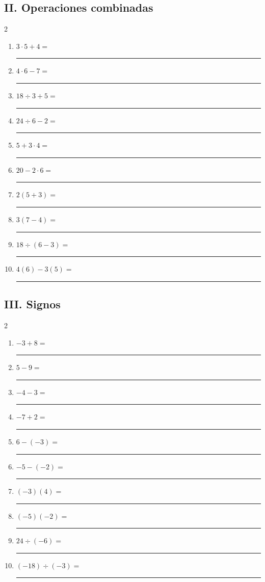\documentclass[11pt]{article}
\begin{document}
\subsection*{II. Operaciones combinadas}
\begin{multicols}{2}\begin{enumerate}[leftmargin=*,start=21]
\item $\displaystyle 3\cdot5+4=$ \rule{2.2cm}{0.4pt}
\item $\displaystyle 4\cdot6-7=$ \rule{2.2cm}{0.4pt}
\item $\displaystyle 18\div3+5=$ \rule{2.2cm}{0.4pt}
\item $\displaystyle 24\div6-2=$ \rule{2.2cm}{0.4pt}
\item $\displaystyle 5+3\cdot4=$ \rule{2.2cm}{0.4pt}
\item $\displaystyle 20-2\cdot6=$ \rule{2.2cm}{0.4pt}
\item $\displaystyle 2(5+3)=$ \rule{2.2cm}{0.4pt}
\item $\displaystyle 3(7-4)=$ \rule{2.2cm}{0.4pt}
\item $\displaystyle 18\div(6-3)=$ \rule{2.2cm}{0.4pt}
\item $\displaystyle 4(6)-3(5)=$ \rule{2.2cm}{0.4pt}
\end{enumerate}\end{multicols}
\subsection*{III. Signos}
\begin{multicols}{2}\begin{enumerate}[leftmargin=*,start=31]
\item $\displaystyle -3+8=$ \rule{2.2cm}{0.4pt}
\item $\displaystyle 5-9=$ \rule{2.2cm}{0.4pt}
\item $\displaystyle -4-3=$ \rule{2.2cm}{0.4pt}
\item $\displaystyle -7+2=$ \rule{2.2cm}{0.4pt}
\item $\displaystyle 6-(-3)=$ \rule{2.2cm}{0.4pt}
\item $\displaystyle -5-(-2)=$ \rule{2.2cm}{0.4pt}
\item $\displaystyle (-3)(4)=$ \rule{2.2cm}{0.4pt}
\item $\displaystyle (-5)(-2)=$ \rule{2.2cm}{0.4pt}
\item $\displaystyle 24\div(-6)=$ \rule{2.2cm}{0.4pt}
\item $\displaystyle (-18)\div(-3)=$ \rule{2.2cm}{0.4pt}
\end{enumerate}\end{multicols}
\end{document}
